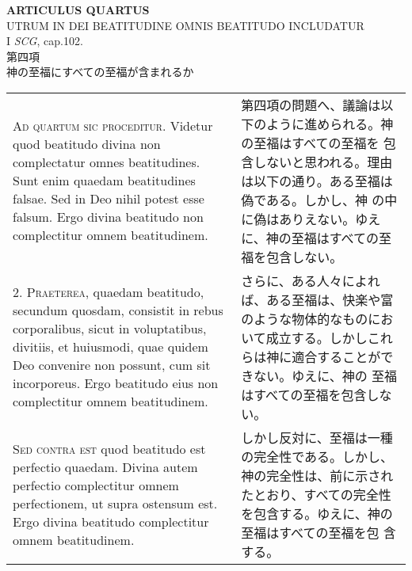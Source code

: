 \documentclass[10pt]{jsarticle} %
\begin{document}
\begin{center}
 {\Large {\bf ARTICULUS QUARTUS}}\\
 {\large UTRUM IN DEI BEATITUDINE OMNIS BEATITUDO INCLUDATUR}\\
 {\footnotesize I {\itshape SCG}, cap.102.}\\
 {\Large 第四項\\神の至福にすべての至福が含まれるか}
\end{center}

\begin{longtable}{p{21em}p{21em}}



{\Huge A}{\scshape d quartum sic proceditur}. Videtur quod beatitudo divina non
complectatur omnes beatitudines. Sunt enim quaedam beatitudines
falsae. Sed in Deo nihil potest esse falsum. Ergo divina beatitudo non
complectitur omnem beatitudinem.


&

第四項の問題へ、議論は以下のように進められる。神の至福はすべての至福を
包含しないと思われる。理由は以下の通り。ある至福は偽である。しかし、神
の中に偽はありえない。ゆえに、神の至福はすべての至福を包含しない。

\\



2. {\scshape Praeterea}, quaedam beatitudo, secundum quosdam,
consistit in rebus corporalibus, sicut in voluptatibus, divitiis, et
huiusmodi, quae quidem Deo convenire non possunt, cum sit
incorporeus. Ergo beatitudo eius non complectitur omnem beatitudinem.


&

さらに、ある人々によれば、ある至福は、快楽や富のような物体的なものにお
 いて成立する。しかしこれらは神に適合することができない。ゆえに、神の
 至福はすべての至福を包含しない。


\\



{\scshape Sed contra est} quod beatitudo est perfectio quaedam. Divina autem
perfectio complectitur omnem perfectionem, ut supra ostensum est. Ergo
divina beatitudo complectitur omnem beatitudinem.


&

しかし反対に、至福は一種の完全性である。しかし、神の完全性は、前に示され
 たとおり、すべての完全性を包含する。ゆえに、神の至福はすべての至福を包
 含する。

\\



\end{longtable}
\end{document}
